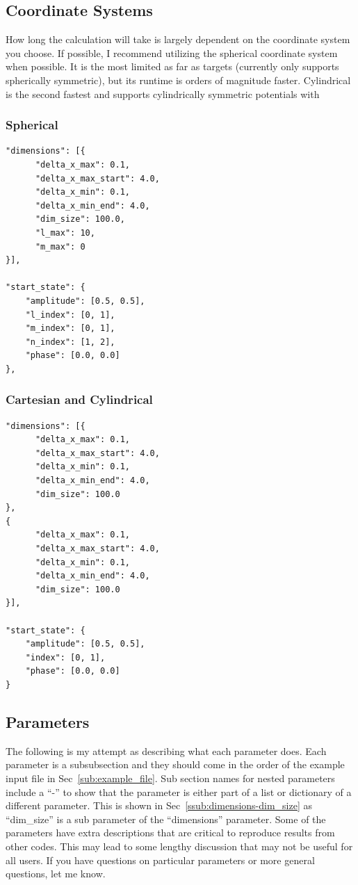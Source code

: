\documentclass{article}
\begin{document}
\subsection{Coordinate Systems} %
\label{sub:coordinate_systems}
How long the calculation will take is largely dependent on the coordinate system you choose. If possible, I recommend utilizing the spherical coordinate system when possible. It is the most limited as far as targets (currently only supports spherically symmetric), but its runtime is orders of magnitude faster. Cylindrical is the second fastest and supports cylindrically symmetric potentials with 
\subsubsection{Spherical} %
\label{ssub:spherical}
\begin{verbatim}
"dimensions": [{
      "delta_x_max": 0.1,
      "delta_x_max_start": 4.0,
      "delta_x_min": 0.1,
      "delta_x_min_end": 4.0,
      "dim_size": 100.0,
      "l_max": 10, 
      "m_max": 0
}],

"start_state": {
    "amplitude": [0.5, 0.5], 
    "l_index": [0, 1], 
    "m_index": [0, 1], 
    "n_index": [1, 2], 
    "phase": [0.0, 0.0]
},
\end{verbatim}

\subsubsection{Cartesian and Cylindrical} %
\label{ssub:cartesian_and_cylindrical}
\begin{verbatim}
"dimensions": [{
      "delta_x_max": 0.1,
      "delta_x_max_start": 4.0,
      "delta_x_min": 0.1,
      "delta_x_min_end": 4.0,
      "dim_size": 100.0
},
{
      "delta_x_max": 0.1,
      "delta_x_max_start": 4.0,
      "delta_x_min": 0.1,
      "delta_x_min_end": 4.0,
      "dim_size": 100.0
}],

"start_state": {
    "amplitude": [0.5, 0.5], 
    "index": [0, 1],  
    "phase": [0.0, 0.0]
}
\end{verbatim}


\subsection{Parameters} %
\label{sub:parameters_input}
The following is my attempt as describing what each parameter does. Each parameter is a subsubsection and they should come in the order of the example input file in Sec~\ref{sub:example_file}. Sub section names for nested parameters include a ``-'' to show that the parameter is either part of a list or dictionary of a different parameter. This is shown in Sec~\ref{ssub:dimensions-dim_size} as ``dim\_size'' is a sub parameter of the ``dimensions'' parameter.  Some of the parameters have extra descriptions that are critical to reproduce results from other codes. This may lead to some lengthy discussion that may not be useful for all users. If you have questions on particular parameters or more general questions, let me know.
\end{document}
